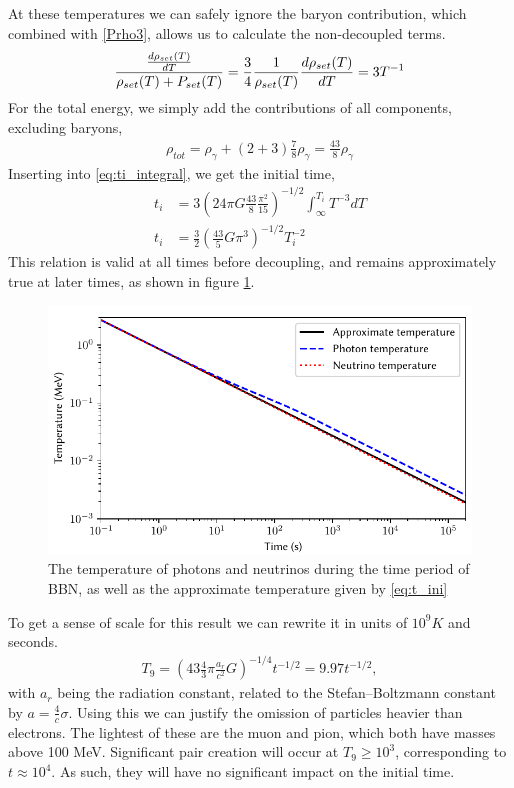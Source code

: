 At these temperatures we can safely ignore the baryon contribution, which combined with \eqref{Prho3}, allows us to calculate the non-decoupled terms.
\begin{align}
    \frac{\frac{d\rho_{set}(T)}{dT}}{\rho_{set}(T) + P_{set}(T)}=\frac{3}{4}\frac{1}{\rho_{set}(T)}\frac{d\rho_{set}(T)}{dT}=3T^{-1}
\end{align}
For the total energy, we simply add the contributions of all components, excluding baryons,
\begin{align}
    \rho_{tot}=\rho_\gamma+(2+3)\frac{7}{8}\rho_\gamma=\frac{43}{8}\rho_\gamma
\end{align}
Inserting into \eqref{eq:ti_integral}, we get the initial time,
\begin{align}
    t_i&=3(24\pi G\frac{43}{8}\frac{\pi^2}{15})^{-1/2}\int_{\infty}^{T_i}T^{-3}dT\\
    t_i&=\frac{3}{2}( \frac{43}{5}G\pi^3)^{-1/2}T_i^{-2}
    \label{eq:t_ini}
\end{align}
This relation is valid at all times before decoupling, and remains approximately true at later times, as shown in figure \ref{fig:Temperature}.
\begin{figure}[ht]
    \includegraphics[width=5.1in]{figures/Temperature.pdf}
    \caption{The temperature of photons and neutrinos during the time period of BBN, as well as the approximate temperature given by \eqref{eq:t_ini}}
    \label{fig:Temperature}
\end{figure}

To get a sense of scale for this result we can rewrite it in units of $10^9K$ and seconds.
\begin{align}
    T_9=( 43 \frac{4}{3}\pi\frac{a_r}{c^2}G)^{-1/4}t^{-1/2}=9.97t^{-1/2},
    \label{eq:T9_ini}
\end{align}
with $a_r$ being the radiation constant, related to the Stefan–Boltzmann constant by $a=\frac{4}{c}\sigma$. 
Using this we can justify the omission of particles heavier than electrons. The lightest of these are the muon and pion, which both have masses above 100 MeV. Significant pair creation will occur at $T_9 \geq 10^3$, corresponding to $t\approx10^4$. As such, they will have no significant impact on the initial time. 


